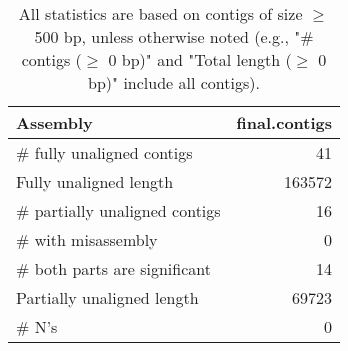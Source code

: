 \documentclass[12pt,a4paper]{article}
\begin{document}
\begin{table}[ht]
\begin{center}
\caption{All statistics are based on contigs of size $\geq$ 500 bp, unless otherwise noted (e.g., "\# contigs ($\geq$ 0 bp)" and "Total length ($\geq$ 0 bp)" include all contigs).}
\begin{tabular}{|l*{1}{|r}|}
\hline
Assembly & final.contigs \\ \hline
\# fully unaligned contigs & 41 \\ \hline
Fully unaligned length & 163572 \\ \hline
\# partially unaligned contigs & 16 \\ \hline
\hspace{5mm}\# with misassembly & 0 \\ \hline
\hspace{5mm}\# both parts are significant & 14 \\ \hline
Partially unaligned length & 69723 \\ \hline
\# N's & 0 \\ \hline
\end{tabular}
\end{center}
\end{table}
\end{document}

